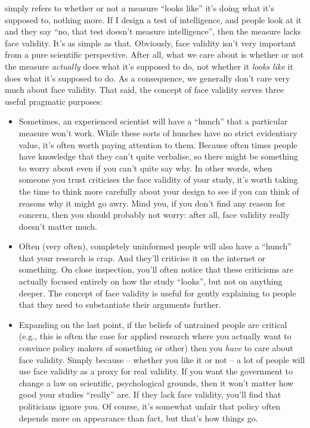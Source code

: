  simply refers to whether or not a measure ``looks like'' it's doing what it's supposed to, nothing more. If I design a test of intelligence, and people look at it and they say ``no, that test doesn't measure intelligence'', then the measure lacks face validity. It's as simple as that. Obviously, face validity isn't very important from a pure scientific perspective. After all, what we care about is whether or not the measure {\it actually} does what it's supposed to do, not whether it {\it looks like} it does what it's supposed to do. As a consequence, we generally don't care very much about face validity. That said, the concept of face validity serves three useful pragmatic  purposes:
\begin{itemize}
\item Sometimes, an experienced scientist will have a ``hunch'' that a particular measure won't work. While these sorts of hunches have no strict evidentiary value, it's often worth paying attention to them. Because often times people have knowledge that they can't quite verbalise, so there might be something to worry about even if you can't quite say why. In other words, when someone you trust criticises the face validity of your study, it's worth taking the time to think more carefully about your design to see if you can think of reasons why it might go awry. Mind you, if you don't find any reason for concern, then you should probably not worry: after all, face validity really doesn't matter much.
\item Often (very often), completely uninformed people will also have a ``hunch'' that your research is crap. And they'll criticise it on the internet or something. On close inspection, you'll often notice that these criticisms are actually focused entirely on how the study ``looks'', but not on anything deeper. The concept of face validity is useful for gently explaining to people that they need to substantiate their arguments further. 
\item Expanding on the last point, if the beliefs of untrained people are critical (e.g., this is often the case for applied research where you actually want to convince policy makers of something or other) then you {\it have} to care about face validity. Simply because -- whether you like it or not -- a lot of people will use face validity as a proxy for real validity. If you want the government to change a law on scientific, psychological grounds, then it won't matter how good your studies ``really'' are. If they lack face validity, you'll find that politicians ignore you. Of course, it's somewhat unfair that policy often depends more on appearance than fact, but that's how things go.
\end{itemize} 



